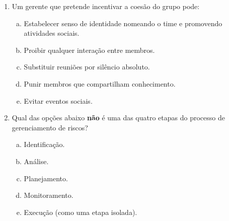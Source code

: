 \documentclass{beamer}
\begin{document}
\begin{frame}
    \begin{enumerate}
        \justifying
        \setcounter{enumi}{32}
        \item<1-2> Um gerente que pretende incentivar a coesão do grupo pode:
        \begin{enumerate}[a)]
            \justifying
            \item<1-2> \alert<2>{Estabelecer senso de identidade nomeando o time e promovendo atividades sociais}.
            \item<1-2> Proibir qualquer interação entre membros.
            \item<1-2> Substituir reuniões por silêncio absoluto.
            \item<1-2> Punir membros que compartilham conhecimento.
            \item<1-2> Evitar eventos sociais.
        \end{enumerate}
        \item<3-4> Qual das opções abaixo \textbf{não} é uma das quatro etapas do processo de gerenciamento de riscos?
        \begin{enumerate}[a)]
            \justifying
            \item<3-4> Identificação.
            \item<3-4> Análise.
            \item<3-4> Planejamento.
            \item<3-4> Monitoramento.
            \item<3-4> \alert<4>{Execução (como uma etapa isolada)}.
        \end{enumerate}
    \end{enumerate}
\end{frame}
\end{document}

